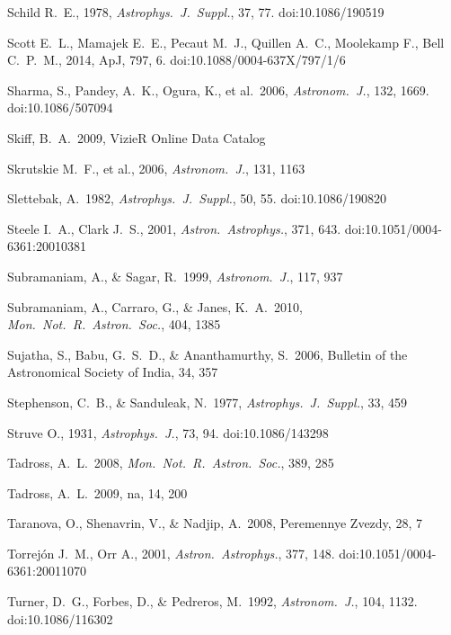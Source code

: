 \documentclass{jaa}
\def\apjs{{\it Astrophys.~J.~Suppl.}}
\def\apj{{\it Astrophys.~J.}}
\def\aj{{\it Astronom.~J.}}
\def\mnras{{\it Mon.~Not.~R.~Astron.~Soc.}}
\def\aap{{\it Astron.~Astrophys.}}
\begin{document}
\begin{thebibliography}{99}
 Schild R.~E., 1978, \apjs, 37, 77. doi:10.1086/190519

 Scott E.~L., Mamajek E.~E., Pecaut M.~J., Quillen A.~C., Moolekamp F., Bell C.~P.~M., 2014, ApJ, 797, 6. doi:10.1088/0004-637X/797/1/6

 Sharma, S., Pandey, A.~K., Ogura, K., et al.\ 2006, \aj, 132, 1669. doi:10.1086/507094

 Skiff, B.~A.\ 2009, VizieR Online Data Catalog

 Skrutskie M.~F., et al., 2006, \aj, 131, 1163 

 Slettebak, A.\ 1982, \apjs, 50, 55. doi:10.1086/190820

 Steele I.~A., Clark J.~S., 2001, \aap, 371, 643. doi:10.1051/0004-6361:20010381

 Subramaniam, A., \& Sagar, R.\ 1999, \aj, 117, 937 

 Subramaniam, A., Carraro, G., \& Janes, K.~A.\ 2010, \mnras, 404, 1385 

 Sujatha, S., Babu, G.~S.~D., \& Ananthamurthy, S.\ 2006, Bulletin of the Astronomical Society of India, 34, 357

 Stephenson, C.~B., \& Sanduleak, N.\ 1977, \apjs, 33, 459

 Struve O., 1931, \apj, 73, 94. doi:10.1086/143298

 Tadross, A.~L.\ 2008, \mnras, 389, 285

 Tadross, A.~L.\ 2009, na, 14, 200 

 Taranova, O., Shenavrin, V., \& Nadjip, A.\ 2008, Peremennye Zvezdy, 28, 7

 Torrej{\'o}n J.~M., Orr A., 2001, \aap, 377, 148. doi:10.1051/0004-6361:20011070

 Turner, D.~G., Forbes, D., \& Pedreros, M.\ 1992, \aj, 104, 1132. doi:10.1086/116302


\end{thebibliography}
\end{document}
